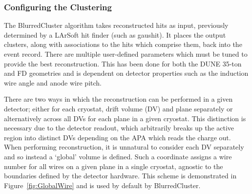 \subsubsection{Configuring the Clustering}\label{sec:BlurredClusterConfiguration}

The BlurredCluster algorithm takes reconstructed hits as input, previously determined by a LArSoft hit finder (such as gaushit).  It places the output clusters, along with associations to the hits which comprise them, back into the event record.  There are multiple user-defined parameters which must be tuned to provide the best reconstruction.  This has been done for both the DUNE 35-ton and FD geometries and is dependent on detector properties such as the induction wire angle and anode wire pitch.

There are two ways in which the reconstruction can be performed in a given detector; either for each cryostat, drift volume (DV) and plane separately or alternatively across all DVs for each plane in a given cryostat.  This distinction is necessary due to the detector readout, which arbitrarily breaks up the active region into distinct DVs depending on the APA which reads the charge out.  When performing reconstruction, it is unnatural to consider each DV separately and so instead a `global' volume is defined.  Such a coordinate assigns a wire number for all wires on a given plane in a single cryostat, agnostic to the boundaries defined by the detector hardware.  This scheme is demonstrated in Figure~\ref{fig:GlobalWire} and is used by default by BlurredCluster.

